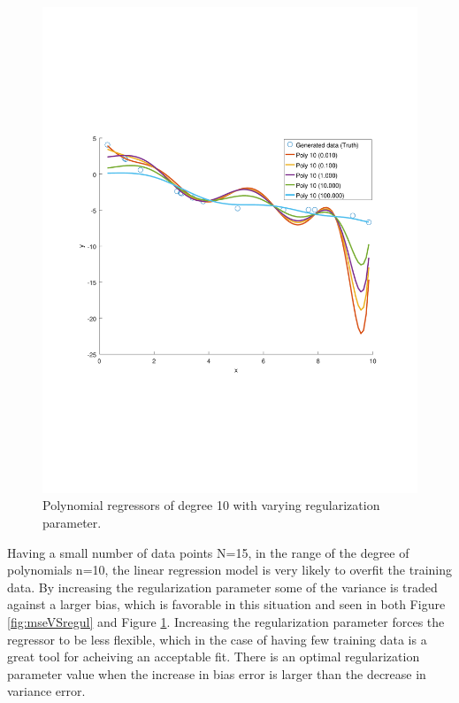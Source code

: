 \documentclass[]{article}
\begin{document}
\begin{figure}[ht]
	\centering
	\includegraphics[trim= 10cm 5cm 10cm 5cm, scale=0.4]{proj1-3_2b-10th}
	\caption{Polynomial regressors of degree 10 with varying regularization parameter.}
	\label{fig:poly10}
\end{figure}
Having a small number of data points N=15, in the range of the degree of polynomials n=10, the linear regression model is very likely to overfit the training data. By increasing the regularization parameter some of the variance is traded against a larger bias, which is favorable in this situation and seen in both Figure \ref{fig:mseVSregul} and Figure \ref{fig:poly10}. Increasing the regularization parameter forces the regressor to be less flexible, which in the case of having few training data is a great tool for acheiving an acceptable fit. There is an optimal regularization parameter value when the increase in bias error is larger than the decrease in variance error.
\end{document}
